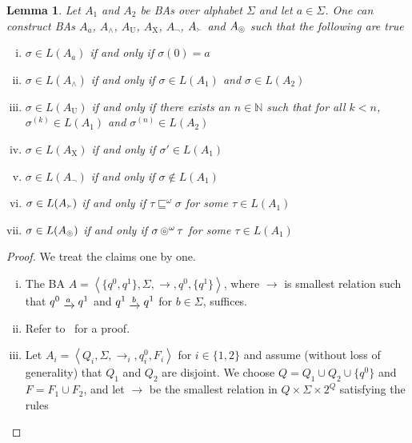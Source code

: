 \documentclass[a4paper]{article}
\newcommand{\naturals}{\mathbb{N}}
\newcommand{\angl}[1]{\left\langle#1\right\rangle}
\newcommand{\myrightarrow}[1]{\mathrel{\raisebox{-3pt}{$\xrightarrow{#1}$}}}
\newcommand{\composable}{\mathop{\ocircle}\nolimits}
\newtheorem{lemma}{Lemma}
\theoremstyle{definition}
\newcommand{\until}{\mathop{U}}
\newcommand{\nxt}{\mathop{X}\nolimits}
\newcommand{\captures}{\mathop{\Yright}}
\begin{document}
\begin{appendix}
\begin{lemma}%
\label{lemma:connectives-on-automata}
Let $A_1$ and $A_2$ be BAs over alphabet $\Sigma$ and let $a \in \Sigma$. One can construct BAs $A_a$, $A_\wedge$, $A_{\until}$, $A_{\nxt}$, $A_\neg$, $A_{\captures}$ and $A_{\composable}$ such that the following are true
\begin{enumerate}[(i)]
    \item\label{claim:ltl-to-buchi-atomic} $\sigma \in L(A_a)$ if and only if $\sigma(0) = a$
    \item\label{claim:ltl-to-buchi-conjunction} $\sigma \in L(A_\wedge)$ if and only if $\sigma \in L(A_1)$ and $\sigma \in L(A_2)$~\cite{choueka-1974}
    \item\label{claim:ltl-to-buchi-until} $\sigma \in L(A_{\until})$ if and only if there exists an $n \in \naturals$ such that for all $k < n$, $\sigma^{(k)} \in L(A_1)$ and $\sigma^{(n)} \in L(A_2)$
    \item\label{claim:ltl-to-buchi-next} $\sigma \in L(A_{\nxt})$ if and only if $\sigma' \in L(A_1)$
    \item\label{claim:ltl-to-buchi-negation} $\sigma \in L(A_\neg)$ if and only if $\sigma \not\in L(A_1)$~\cite{buchi-1962}
    \item\label{claim:ltl-to-buchi-captures} $\sigma \in L(A_{\captures})$ if and only if $\tau \sqsubseteq^\omega \sigma$ for some $\tau \in L(A_1)$
    \item\label{claim:ltl-to-buchi-composable} $\sigma \in L(A_{\composable})$ if and only if $\sigma \composable^\omega \tau$ for some $\tau \in L(A_1)$
\end{enumerate}
\end{lemma}
\begin{proof}
We treat the claims one by one.
\begin{enumerate}[(i)]
    \item The BA $A = \angl{\{ q^0, q^1 \}, \Sigma, \rightarrow, q^0, \{ q^1 \}}$, where $\rightarrow$ is smallest relation such that $q^0 \myrightarrow{a} q^1$ and $q^1 \myrightarrow{b} q^1$ for $b \in \Sigma$, suffices.
    \item Refer to~\cite[Proposition 6]{vardi-1995} for a proof.
    \item Let $A_i = \angl{Q_i, \Sigma, \rightarrow_i, q^0_i, F_i}$ for $i \in \{ 1, 2 \}$ and assume (without loss of generality) that $Q_1$ and $Q_2$ are disjoint. We choose $Q = Q_1 \cup Q_2 \cup \{ q^0 \}$ and $F = F_1 \cup F_2$, and let $\rightarrow$ be the smallest relation in $Q \times \Sigma \times 2^Q$ satisfying the rules

\end{enumerate}
\end{proof}
\end{appendix}
\end{document}
